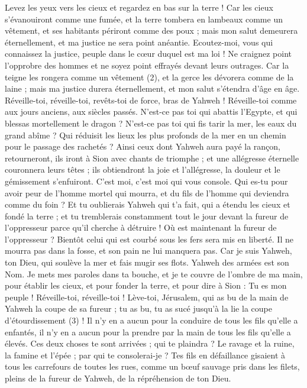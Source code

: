 \begin{multicols}{2}
Levez les yeux vers les cieux et regardez en bas sur la terre ! Car les cieux s'évanouiront comme une fumée, et la terre tombera en lambeaux comme un vêtement, et ses habitants périront comme des poux ; mais mon salut demeurera éternellement, et ma justice ne sera point anéantie.
Ecoutez-moi, vous qui connaissez la justice, peuple dans le cœur duquel est ma loi ! Ne craignez point l'opprobre des hommes et ne soyez point effrayés devant leurs outrages.
Car la teigne les rongera comme un vêtement (2), et la gerce les dévorera comme de la laine ; mais ma justice durera éternellement, et mon salut s’étendra d’âge en âge.
Réveille-toi, réveille-toi, revêts-toi de force, bras de Yahweh ! Réveille-toi comme aux jours anciens, aux siècles passés. N'est-ce pas toi qui abattis l’Egypte, et qui blessas mortellement le dragon ?
N'est-ce pas toi qui fis tarir la mer, les eaux du grand abîme ? Qui réduisit les lieux les plus profonds de la mer en un chemin pour le passage des rachetés ?
Ainsi ceux dont Yahweh aura payé la rançon, retourneront, ils iront à Sion avec chants de triomphe ; et une allégresse éternelle couronnera leurs têtes ; ils obtiendront la joie et l'allégresse, la douleur et le gémissement s'enfuiront.
C'est moi, c'est moi qui vous console. Qui es-tu pour avoir peur de l'homme mortel qui mourra, et du fils de l'homme qui deviendra comme du foin ?
Et tu oublierais Yahweh qui t'a fait, qui a étendu les cieux et fondé la terre ; et tu tremblerais constamment tout le jour devant la fureur de l’oppresseur parce qu’il cherche à détruire ! Où est maintenant la fureur de l’oppresseur ?
Bientôt celui qui est courbé sous les fers sera mis en liberté. Il ne mourra pas dans la fosse, et son pain ne lui manquera pas.
Car je suis Yahweh, ton Dieu, qui soulève la mer et fais mugir ses flots. Yahweh des armées est son Nom.
Je mets mes paroles dans ta bouche, et je te couvre de l'ombre de ma main, pour établir les cieux, et pour fonder la terre, et pour dire à Sion : Tu es mon peuple !
Réveille-toi, réveille-toi ! Lève-toi, Jérusalem, qui as bu de la main de Yahweh la coupe de sa fureur ; tu as bu, tu as sucé jusqu’à la lie la coupe d'étourdissement (3) !
Il n'y en a aucun pour la conduire de tous les fils qu'elle a enfantés, il n’y en a aucun pour la prendre par la main de tous les fils qu’elle a élevés.
Ces deux choses te sont arrivées ; qui te plaindra ? Le ravage et la ruine, la famine et l'épée ; par qui te consolerai-je ?
Tes fils en défaillance gisaient à tous les carrefours de toutes les rues, comme un bœuf sauvage pris dans les filets, pleins de la fureur de Yahweh, de la répréhension de ton Dieu.

\end{multicols}
